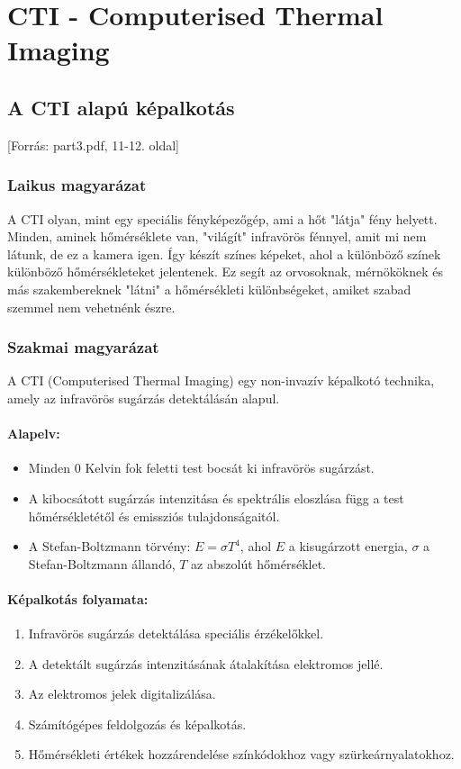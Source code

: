 \documentclass[a4paper,12pt]{article}
\begin{document}
\newpage

\section{CTI - Computerised Thermal Imaging}

\subsection{A CTI alapú képalkotás} [Forrás: part3.pdf, 11-12. oldal]

\subsubsection{Laikus magyarázat} A CTI olyan, mint egy speciális fényképezőgép, ami a hőt "látja" fény helyett. Minden, aminek hőmérséklete van, "világít" infravörös fénnyel, amit mi nem látunk, de ez a kamera igen. Így készít színes képeket, ahol a különböző színek különböző hőmérsékleteket jelentenek. Ez segít az orvosoknak, mérnököknek és más szakembereknek "látni" a hőmérsékleti különbségeket, amiket szabad szemmel nem vehetnénk észre.

\subsubsection{Szakmai magyarázat} A CTI (Computerised Thermal Imaging) egy non-invazív képalkotó technika, amely az infravörös sugárzás detektálásán alapul.

\paragraph{Alapelv:} 
\begin{itemize}
    \item Minden 0 Kelvin fok feletti test bocsát ki infravörös sugárzást.
    \item A kibocsátott sugárzás intenzitása és spektrális eloszlása függ a test hőmérsékletétől és emissziós tulajdonságaitól.
    \item A Stefan-Boltzmann törvény: \( E = \sigma T^4 \), ahol \( E \) a kisugárzott energia, \( \sigma \) a Stefan-Boltzmann állandó, \( T \) az abszolút hőmérséklet.
\end{itemize}

\paragraph{Képalkotás folyamata:} \begin{enumerate} \item Infravörös sugárzás detektálása speciális érzékelőkkel. \item A detektált sugárzás intenzitásának átalakítása elektromos jellé. \item Az elektromos jelek digitalizálása. \item Számítógépes feldolgozás és képalkotás. \item Hőmérsékleti értékek hozzárendelése színkódokhoz vagy szürkeárnyalatokhoz. \end{enumerate}
\end{document}
